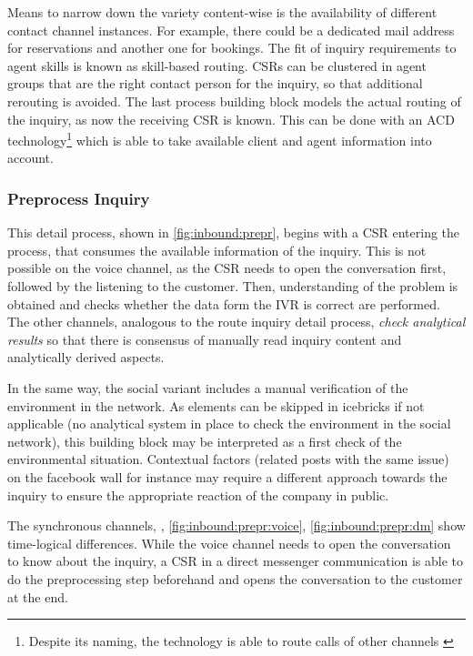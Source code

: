 	 Means to narrow down the variety content-wise is the availability of different contact channel instances. For example, there could be a dedicated mail address for reservations and another one for bookings. The fit of inquiry requirements to agent skills is known as skill-based routing. \acrshort{CSR}s can be clustered in agent groups that are the right contact person for the inquiry, so that additional rerouting is avoided. The last process building block models the actual routing of the inquiry, as now the receiving  \acrshort{CSR} is known. This can be done with an \acrfull{ACD} technology\footnote{Despite its naming, the technology is able to route calls of other channels \citep{ccnet2016} } which is able to take available client and agent information into account.
	 
	 
	 \subsubsection{Preprocess Inquiry}
	 
	 This detail process, shown in \Fig \ref{fig:inbound:prepr}, begins with a \acrshort{CSR} entering the process, that consumes the available information of the inquiry. This is not possible on the voice channel, as the \acrshort{CSR} needs to open the conversation first, followed by the listening to the customer. Then, understanding of the problem is obtained and checks whether the data form the \acrshort{IVR} is correct are performed. The other channels, analogous to the route inquiry detail process, \textit{check analytical results} so that there is consensus of manually read inquiry content and analytically derived aspects.
	 
	 In the same way, the social variant includes a manual verification of the environment in the network. As elements can be skipped in icebricks if not applicable (\ie no analytical system in place to check the environment in the social network), this building block may be interpreted as a first check of the environmental situation. Contextual factors (related posts with the same issue) on the facebook wall for instance may require a different approach towards the inquiry to ensure the appropriate reaction of the company in public.   
	 
	 The synchronous channels, \ie, \Fig \ref{fig:inbound:prepr:voice}, \ref{fig:inbound:prepr:dm} show time-logical differences. While the voice channel needs to open the conversation to know about the inquiry, a \acrshort{CSR} in a direct messenger communication is able to do the preprocessing step beforehand and opens the conversation to the customer at the end. 
	 

